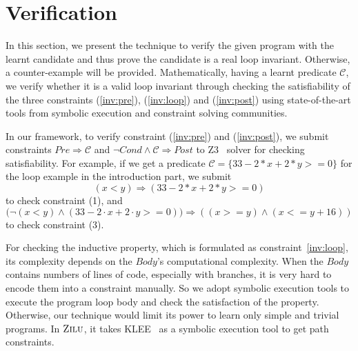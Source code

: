 
\section{Verification} %


In this section, we present the technique to verify the given program with the learnt candidate
and thus prove the candidate is a real loop invariant.
Otherwise, a counter-example will be provided.
Mathematically, having a learnt predicate $\mathcal{C}$, we verify whether it is a valid loop invariant through
checking the satisfiability of the three constraints (\ref{inv:pre}), (\ref{inv:loop}) and (\ref{inv:post})
using state-of-the-art tools from symbolic execution and constraint solving communities.

In our framework, to verify constraint (\ref{inv:pre}) and (\ref{inv:post}),
we submit constraints $Pre \Rightarrow \mathcal{C}$
and $\neg {Cond} \wedge \mathcal{C} \Rightarrow Post$
to Z3~\cite{de2008z3} solver for checking satisfiability.
For example, if we get a predicate $\mathcal{C} = \{33-2*x+2*y>=0\}$
for the loop example in the introduction part,
we submit
$$(x<y) \Rightarrow (33-2*x+2*y>=0)$$
to check constraint (1), and
$$\big(\neg(x<y) \wedge (33-2\cdot x+2\cdot y>=0)\big) \Rightarrow ((x >= y) \wedge (x <= y + 16))$$
to check constraint (3).

For checking the inductive property, which is formulated as constraint~\ref{inv:loop},
its complexity depends on the $Body$'s computational complexity.
When the $Body$ contains numbers of lines of code, especially with branches,
it is very hard to encode them into a constraint manually.
So we adopt symbolic execution tools to execute the program loop body
and check the satisfaction of the property.
Otherwise, our technique would limit its power to learn only simple and trivial programs.
In $\textsc{Zilu}$, it takes KLEE~\cite{cadar2008klee} as a symbolic execution tool to get path constraints.

